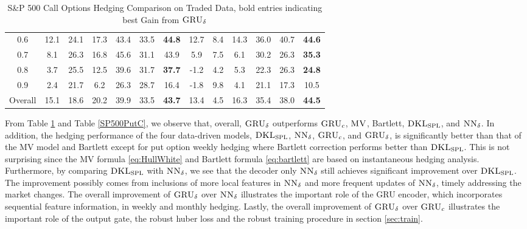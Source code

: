 \documentclass[letterpaper,12pt,titlepage,oneside,final]{book}
\numberwithin{equation}{section}
\theoremstyle{definition}
\newcommand{\model}{\textsc{GRU}_\delta}
\newcommand{\modelN}{\textsc{NN}_\delta}
\newcommand{\DKLs}{\bf\textsc{DKL}_{\text{SPL}}}
\newcommand{\MV}{\bf \textsc{MV}}
\begin{document}
\begin{table}[htp!]
\begin{threeparttable}
\begin{tabular}{|c|cccccc| cccccc|}
			0.6 &12.1 &24.1   &17.3     &43.4  &33.5 &\textbf{44.8}    &12.7  & 8.4  &14.3 &36.0       &40.7  & \textbf{44.6}  \\
			
			0.7 &8.1  &26.3   &16.8         &45.6  & 31.1 &43.9    &5.9   & 7.5   &6.1  &30.2        &26.3 & \textbf{35.3}  \\
			
			0.8 &3.7  &25.5   &12.5     &39.6  &31.7 &\textbf{37.7}   &-1.2  & 4.2   &5.3      &22.3         &26.3 & \textbf{24.8}  \\
			
			0.9 &2.4  &21.7   &6.2      &26.3 &28.7&16.4     &-1.8  &9.8    &4.1  &21.1       & 17.3& 10.5  \\
			
			Overall&15.1&18.6 &20.2     &39.9 &33.5  &\textbf{43.7}    &13.4  & 4.5   &16.3 &35.4     &38.0    & \textbf{44.5}  \\
			\hline
		\end{tabular}
		\caption{S\&P 500 Call Options Hedging Comparison on Traded Data, bold entries indicating best Gain from $\model$}
\label{SP500CallC}
\end{threeparttable}
\end{table}


 From  Table \ref{SP500CallC} and Table \ref{SP500PutC},  we observe that, overall, $\model$ outperforms $\textsc{GRU}_{c}$, $\MV$, Bartlett, $\DKLs$, and $\modelN$. In addition,
 the hedging performance of the four data-driven models, $\DKLs$, $\modelN$, $\textsc{GRU}_{c}$, and $\model$, is   significantly better than that of the MV model and Bartlett except for put option weekly hedging where Bartlett correction performs better than $\DKLs$. This is not surprising since the MV formula \eqref{eq:HullWhite} and Bartlett formula \eqref{eq:bartlett} are based on instantaneous hedging analysis.  Furthermore, by comparing $\DKLs$ with $\modelN$, we  see that the decoder only $\modelN$ still achieves significant improvement over $\DKLs$. The improvement possibly comes from inclusions of more local features in $\modelN$ and more frequent updates of $\modelN$, timely addressing the market changes. The overall improvement of $\model$ over $\modelN$ illustrates the important role of the GRU encoder, which incorporates sequential feature information, in weekly and monthly hedging. Lastly,  the overall improvement of $\model$ over $\textsc{GRU}_{c}$ illustrates the important role of the output gate, the robust huber loss and the robust training procedure in section \ref{sec:train}.
\end{document}
